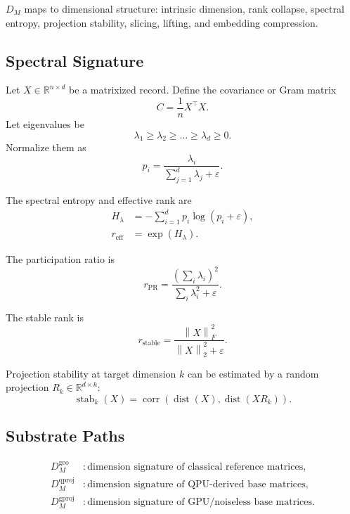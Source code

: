 \documentclass[11pt]{article}
\newcommand{\R}{\mathbb{R}}
\newcommand{\norm}[1]{\left\lVert #1 \right\rVert}
\newcommand{\Dm}{D_M}
\newcommand{\geo}{\mathrm{geo}}
\newcommand{\qproj}{\mathrm{qproj}}
\newcommand{\gproj}{\mathrm{gproj}}
\begin{document}
\(\Dm\) maps to dimensional structure: intrinsic dimension, rank collapse,
spectral entropy, projection stability, slicing, lifting, and embedding
compression.

\subsection{Spectral Signature}

Let \(X \in \R^{n\times d}\) be a matrixized record. Define the covariance or
Gram matrix
\begin{equation}
  C = \frac{1}{n}X^\top X.
\end{equation}
Let eigenvalues be
\[
  \lambda_1 \geq \lambda_2 \geq \dots \geq \lambda_d \geq 0.
\]
Normalize them as
\begin{equation}
  p_i = \frac{\lambda_i}{\sum_{j=1}^{d}\lambda_j + \varepsilon}.
\end{equation}

The spectral entropy and effective rank are
\begin{align}
  H_\lambda &= -\sum_{i=1}^{d} p_i \log(p_i+\varepsilon),\\
  r_{\mathrm{eff}} &= \exp(H_\lambda).
\end{align}

The participation ratio is
\begin{equation}
  r_{\mathrm{PR}} =
  \frac{\left(\sum_i \lambda_i\right)^2}
       {\sum_i \lambda_i^2+\varepsilon}.
\end{equation}

The stable rank is
\begin{equation}
  r_{\mathrm{stable}} =
  \frac{\norm{X}_F^2}{\norm{X}_2^2+\varepsilon}.
\end{equation}

Projection stability at target dimension \(k\) can be estimated by a random
projection \(R_k \in \R^{d\times k}\):
\begin{equation}
  \operatorname{stab}_k(X)
  =
  \operatorname{corr}
  \left(
    \operatorname{dist}(X),
    \operatorname{dist}(XR_k)
  \right).
\end{equation}

\subsection{Substrate Paths}

\begin{align}
  \Dm^{\geo}   &: \text{dimension signature of classical reference matrices},\\
  \Dm^{\qproj} &: \text{dimension signature of QPU-derived base matrices},\\
  \Dm^{\gproj} &: \text{dimension signature of GPU/noiseless base matrices}.
\end{align}
\end{document}
